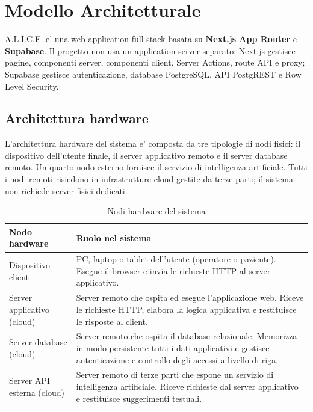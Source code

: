 \section{Modello Architetturale}

A.L.I.C.E. e' una web application full-stack basata su \textbf{Next.js App Router} e \textbf{Supabase}. Il progetto non usa un application server separato: Next.js gestisce pagine, componenti server, componenti client, Server Actions, route API e proxy; Supabase gestisce autenticazione, database PostgreSQL, API PostgREST e Row Level Security.

\subsection{Architettura hardware}

L'architettura hardware del sistema e' composta da tre tipologie di nodi fisici: il dispositivo dell'utente finale, il server applicativo remoto e il server database remoto. Un quarto nodo esterno fornisce il servizio di intelligenza artificiale. Tutti i nodi remoti risiedono in infrastrutture cloud gestite da terze parti; il sistema non richiede server fisici dedicati.

\begin{table}[H]
\centering
\renewcommand{\arraystretch}{1.25}
\begin{tabularx}{\textwidth}{|l|X|}
\hline
\textbf{Nodo hardware} & \textbf{Ruolo nel sistema} \\
\hline
Dispositivo client & PC, laptop o tablet dell'utente (operatore o paziente). Esegue il browser e invia le richieste HTTP al server applicativo. \\
\hline
Server applicativo (cloud) & Server remoto che ospita ed esegue l'applicazione web. Riceve le richieste HTTP, elabora la logica applicativa e restituisce le risposte al client. \\
\hline
Server database (cloud) & Server remoto che ospita il database relazionale. Memorizza in modo persistente tutti i dati applicativi e gestisce autenticazione e controllo degli accessi a livello di riga. \\
\hline
Server API esterna (cloud) & Server remoto di terze parti che espone un servizio di intelligenza artificiale. Riceve richieste dal server applicativo e restituisce suggerimenti testuali. \\
\hline
\end{tabularx}
\caption{Nodi hardware del sistema}
\label{tab:arch-hw}
\end{table}

